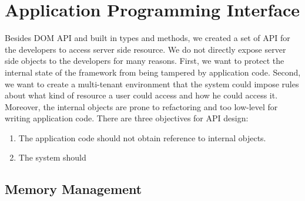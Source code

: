 \chapter{Application Programming Interface}
Besides DOM API and built in types and methods,
we created a set of API for the developers to access server side resource.
We do not directly expose server side objects to the developers for many reasons.
First, we want to protect the internal state of the framework from 
being tampered by application code.
Second, 
we want to create a multi-tenant environment that 
the system could impose rules about what kind of resource a user could access and how
he could access it.
Moreover, 
the internal objects are prone to refactoring and 
too low-level for writing application code.
There are three objectives for API design:
\begin{enumerate}
\item The application code should not obtain reference to internal objects.
\item The system should 
\end{enumerate}



\section{Memory Management}